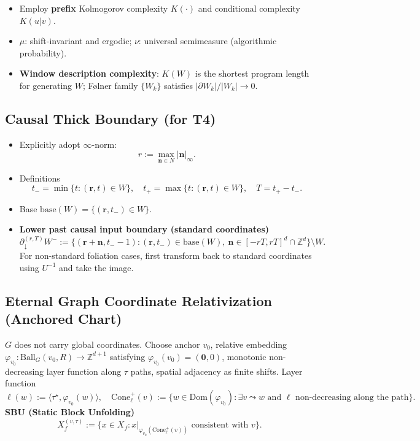 \documentclass[11pt]{article}
\theoremstyle{definition}
\theoremstyle{remark}
\begin{document}
\begin{itemize}
\item Employ \textbf{prefix} Kolmogorov complexity \( K(\cdot) \) and conditional complexity \( K(u|v) \).
\item \( \mu \): shift-invariant and ergodic; \( \nu \): universal semimeasure (algorithmic probability).
\item \textbf{Window description complexity}: \( K(W) \) is the shortest program length for generating \( W \); Følner family \( \{W_k\} \) satisfies \( |\partial W_k| / |W_k| \to 0 \).
\end{itemize}

\subsection{Causal Thick Boundary (for T4)}

\begin{itemize}
\item Explicitly adopt \( \infty \)-norm:
\[
r := \max_{\mathbf{n} \in N} |\mathbf{n}|_\infty.
\]
\item Definitions
\[
t_- = \min\{t : (\mathbf{r}, t) \in W\}, \quad t_+ = \max\{t : (\mathbf{r}, t) \in W\}, \quad T = t_+ - t_-.
\]
\item Base \( \mathrm{base}(W) = \{(\mathbf{r}, t_-) \in W\} \).
\item \textbf{Lower past causal input boundary (standard coordinates)}
\[
\partial_\downarrow^{(r,T)} W^- := \{(\mathbf{r} + \mathbf{n}, t_- - 1) : (\mathbf{r}, t_-) \in \mathrm{base}(W), \ \mathbf{n} \in [-rT, rT]^d \cap \mathbb{Z}^d\} \setminus W.
\]
For non-standard foliation cases, first transform back to standard coordinates using \( U^{-1} \) and take the image.
\end{itemize}

\subsection{Eternal Graph Coordinate Relativization (Anchored Chart)}

\( G \) does not carry global coordinates. Choose anchor \( v_0 \), relative embedding \( \varphi_{v_0}: \mathrm{Ball}_G(v_0, R) \to \mathbb{Z}^{d+1} \) satisfying \( \varphi_{v_0}(v_0) = (\mathbf{0}, 0) \), monotonic non-decreasing layer function along \( \tau \) paths, spatial adjacency as finite shifts.
Layer function
\[
\ell(w) := \langle \tau^\star, \varphi_{v_0}(w) \rangle, \quad \mathrm{Cone}_\ell^+(v) := \{w \in \mathrm{Dom}(\varphi_{v_0}) : \exists v \leadsto w \text{ and } \ell \text{ non-decreasing along the path}\}.
\]
\textbf{SBU (Static Block Unfolding)}
\[
X_f^{(v,\tau)} := \{x \in X_f : x|_{\varphi_{v_0}(\mathrm{Cone}_\ell^+(v))} \text{ consistent with } v\}.
\]
\end{document}
